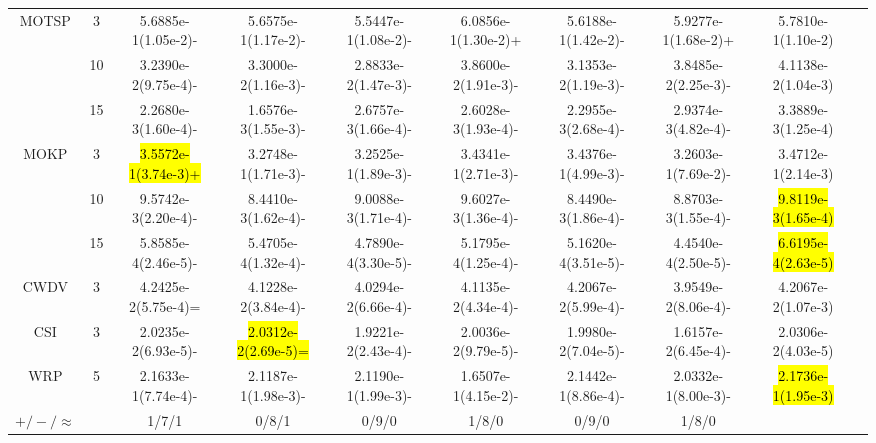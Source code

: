 \documentclass[a4paper,fleqn]{cas-dc}
\newcommand{\highlight}[1]{
	\begingroup
	\sethlcolor{Seashell}%
	\hl{#1}%
	\endgroup
}
\begin{document}
\begin{sloppypar}
\begin{table}[ht]
{\begin{tabular}{cccccccccc}
			\multirow{3}{*}{MOTSP} &3 &5.6885e-1(1.05e-2)- &5.6575e-1(1.17e-2)-	&5.5447e-1(1.08e-2)-	&6.0856e-1(1.30e-2)+	&5.6188e-1(1.42e-2)-	&5.9277e-1(1.68e-2)+		&5.7810e-1(1.10e-2)\\
			\multirow{3}{*}{~}&10  &3.2390e-2(9.75e-4)- &3.3000e-2(1.16e-3)-	&2.8833e-2(1.47e-3)-	&3.8600e-2(1.91e-3)-	&3.1353e-2(1.19e-3)-	&3.8485e-2(2.25e-3)-		&4.1138e-2(1.04e-3)\\
			\multirow{3}{*}{~}&15  &2.2680e-3(1.60e-4)- &1.6576e-3(1.55e-3)-	&2.6757e-3(1.66e-4)-	&2.6028e-3(1.93e-4)-	&2.2955e-3(2.68e-4)-	&2.9374e-3(4.82e-4)-		&3.3889e-3(1.25e-4)\\
			\midrule[0.35pt]
			\multirow{3}{*}{MOKP} &3 &\highlight{3.5572e-1(3.74e-3)+}	&3.2748e-1(1.71e-3)-	&3.2525e-1(1.89e-3)-	&3.4341e-1(2.71e-3)-	&3.4376e-1(4.99e-3)-	&3.2603e-1(7.69e-2)-		&3.4712e-1(2.14e-3)\\
			\multirow{3}{*}{~}&10  	&9.5742e-3(2.20e-4)- &8.4410e-3(1.62e-4)-	&9.0088e-3(1.71e-4)-	&9.6027e-3(1.36e-4)-	&8.4490e-3(1.86e-4)-	&8.8703e-3(1.55e-4)-		&\highlight{9.8119e-3(1.65e-4)}\\
			\multirow{3}{*}{~}&15 	&5.8585e-4(2.46e-5)- &5.4705e-4(1.32e-4)-	&4.7890e-4(3.30e-5)-	&5.1795e-4(1.25e-4)-	&5.1620e-4(3.51e-5)-	&4.4540e-4(2.50e-5)-		&\highlight{6.6195e-4(2.63e-5)}\\
			\midrule[0.35pt]
			{{CWDV}} &3  &4.2425e-2(5.75e-4)= &4.1228e-2(3.84e-4)-	&4.0294e-2(6.66e-4)-	&4.1135e-2(4.34e-4)-	&4.2067e-2(5.99e-4)-	&3.9549e-2(8.06e-4)-		&4.2067e-2(1.07e-3)\\
			{{CSI}}&3  &2.0235e-2(6.93e-5)- &\highlight{2.0312e-2(2.69e-5)=}	&1.9221e-2(2.43e-4)-	&2.0036e-2(9.79e-5)-	&1.9980e-2(7.04e-5)-	&1.6157e-2(6.45e-4)-		&2.0306e-2(4.03e-5)\\
			{{WRP}}&5  &2.1633e-1(7.74e-4)- &2.1187e-1(1.98e-3)-	&2.1190e-1(1.99e-3)-	&1.6507e-1(4.15e-2)-	&2.1442e-1(8.86e-4)-	&2.0332e-1(8.00e-3)-		&\highlight{2.1736e-1(1.95e-3)}\\
			\midrule[0.35pt]
			$+/-/\approx$&~ &1/7/1  &0/8/1	&0/9/0	&1/8/0	&0/9/0		&1/8/0
			\\
			\hline
		\end{tabular}
	}
\end{table}



\end{sloppypar}
\end{document}
